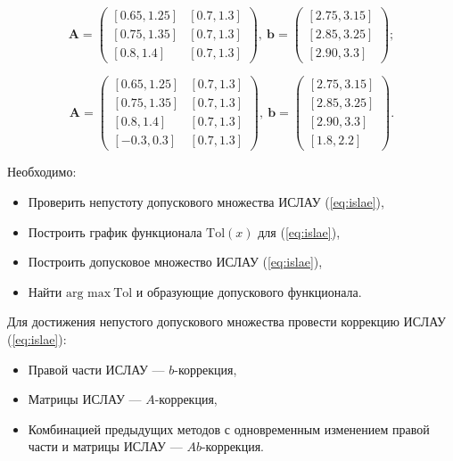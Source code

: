 \documentclass[a4paper,14pt]{article}
\begin{document}
  \begin{equation} \label{eq:problem_2}
    \mathbf{A} = \begin{pmatrix}
      [0.65, 1.25] & [0.7, 1.3] \\
      [0.75, 1.35] & [0.7, 1.3] \\
      [0.8, 1.4] & [0.7, 1.3]
    \end{pmatrix},
    ~
    \mathbf{b} = \begin{pmatrix}
      [2.75, 3.15] \\
      [2.85, 3.25] \\
      [2.90, 3.3]
    \end{pmatrix};
  \end{equation}

  \begin{equation} \label{eq:problem_3}
    \mathbf{A} = \begin{pmatrix}
      [0.65, 1.25] & [0.7, 1.3] \\
      [0.75, 1.35] & [0.7, 1.3] \\
      [0.8, 1.4] & [0.7, 1.3] \\
      [-0.3, 0.3] & [0.7, 1.3]
    \end{pmatrix},
    ~
    \mathbf{b} = \begin{pmatrix}
      [2.75, 3.15] \\
      [2.85, 3.25] \\
      [2.90, 3.3] \\
      [1.8, 2.2]
    \end{pmatrix}.
  \end{equation}

  Необходимо:

  \begin{itemize}
    \item Проверить непустоту допускового множества ИСЛАУ (\ref{eq:islae}),
    \item Построить график функционала \( \text{Tol}(x) \) для (\ref{eq:islae}),
    \item Построить допусковое множество ИСЛАУ (\ref{eq:islae}),
    \item Найти \( \text{arg max} \ \text{Tol} \) и образующие допускового
      функционала.
  \end{itemize}

  Для достижения непустого допускового множества провести коррекцию ИСЛАУ
  (\ref{eq:islae}):

  \begin{itemize}
    \item Правой части ИСЛАУ --- \( b \)-коррекция,
    \item Матрицы ИСЛАУ --- \( A \)-коррекция,
    \item Комбинацией предыдущих методов с одновременным изменением
      правой части и матрицы ИСЛАУ — \( Ab \)-коррекция.
  \end{itemize}
\end{document}
